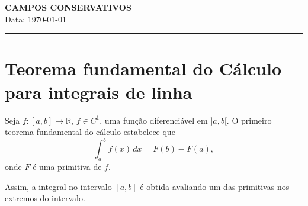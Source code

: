 \documentclass[11pt]{article}
\theoremstyle{definition}
\begin{document}
	
	\begin{center}
		\Large\textbf{CAMPOS CONSERVATIVOS} \\
		\normalsize
		Data: \today
	\end{center}
	
	\hrule
	\vspace{1em}
	
	\tableofcontents
	\newpage
	
	\section{Teorema fundamental do Cálculo para integrais de linha}
	\label{sec:tfc}
	
	Seja $f:[a,b]\to \mathbb{R}$, $f\in C^1$, uma função diferenciável em $]a,b[$.
	O primeiro teorema fundamental do cálculo estabelece que
	\begin{equation*}
		\int_{a}^{b} f(x)\, dx=F(b)-F(a),
	\end{equation*}
	onde $F$ é uma primitiva de $f$.
	
	Assim, a integral no intervalo $[a,b]$ é obtida avaliando um das primitivas nos extremos do intervalo.
	
\end{document}
